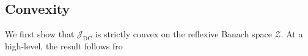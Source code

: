\documentclass[final,1p,times]{elsarticle}
\begin{document}
\subsection{Convexity}\label{append:convexity}

We first show that $ \mathcal{J}_{\mathrm{DC}} $ is strictly convex on the reflexive Banach space $ \mathcal{Z} $. 
At a high-level, the result follows fro
\end{document}
